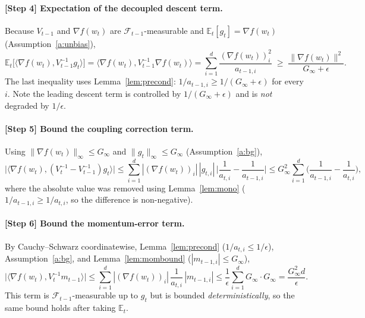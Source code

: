 \documentclass[11pt]{article}
\begin{document}
\paragraph{[Step 4] Expectation of the decoupled descent term.}
Because $V_{t-1}$ and $\nabla f(w_t)$ are $\mathcal{F}_{t-1}$-measurable and
$\mathbb{E}_t[g_t]=\nabla f(w_t)$ (Assumption~\ref{a:unbias}),
\[
\mathbb{E}_t\big[\langle \nabla f(w_t), V_{t-1}^{-1} g_t\rangle\big]
= \langle \nabla f(w_t), V_{t-1}^{-1}\nabla f(w_t)\rangle
= \sum_{i=1}^d \frac{(\nabla f(w_t))_i^2}{a_{t-1,i}}
\;\ge\; \frac{\|\nabla f(w_t)\|^2}{G_\infty+\epsilon}.
\]
The last inequality uses Lemma~\ref{lem:precond}:
$1/a_{t-1,i}\ge 1/(G_\infty+\epsilon)$ for every $i$. Note the leading descent
term is controlled by $1/(G_\infty+\epsilon)$ and is \emph{not} degraded by
$1/\epsilon$.

\paragraph{[Step 5] Bound the coupling correction term.}
Using $\|\nabla f(w_t)\|_\infty\le G_\infty$ and $\|g_t\|_\infty\le G_\infty$
(Assumption~\ref{a:bg}),
\[
\big|\langle \nabla f(w_t), (V_t^{-1}-V_{t-1}^{-1}) g_t\rangle\big|
\le \sum_{i=1}^d |(\nabla f(w_t))_i|\,|g_{t,i}|\,
   \Big|\frac{1}{a_{t,i}}-\frac{1}{a_{t-1,i}}\Big|
\le G_\infty^2 \sum_{i=1}^d
   \Big(\frac{1}{a_{t-1,i}}-\frac{1}{a_{t,i}}\Big),
\]
where the absolute value was removed using Lemma~\ref{lem:mono}
($1/a_{t-1,i}\ge 1/a_{t,i}$, so the difference is non-negative).

\paragraph{[Step 6] Bound the momentum-error term.}
By Cauchy--Schwarz coordinatewise, Lemma~\ref{lem:precond}
($1/a_{t,i}\le 1/\epsilon$), Assumption~\ref{a:bg}, and
Lemma~\ref{lem:mombound} ($|m_{t-1,i}|\le G_\infty$),
\[
\big|\langle \nabla f(w_t), V_t^{-1} m_{t-1}\rangle\big|
\le \sum_{i=1}^d |(\nabla f(w_t))_i|\,\frac{1}{a_{t,i}}\,|m_{t-1,i}|
\le \frac{1}{\epsilon}\sum_{i=1}^d G_\infty\cdot G_\infty
= \frac{G_\infty^2 d}{\epsilon}.
\]
This term is $\mathcal{F}_{t-1}$-measurable up to $g_t$ but is bounded
\emph{deterministically}, so the same bound holds after taking $\mathbb{E}_t$.
\end{document}
